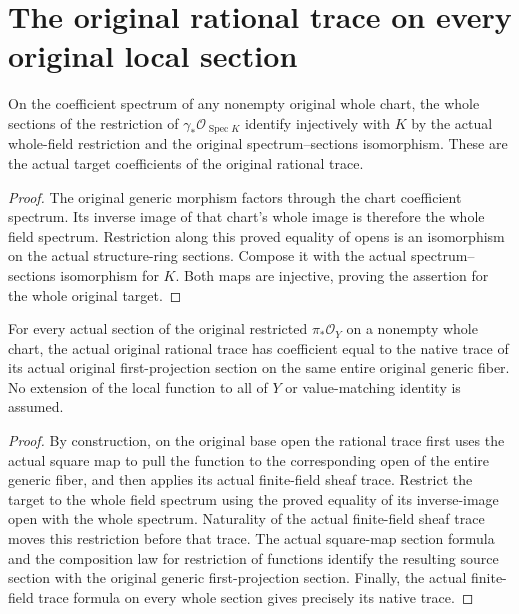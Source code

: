 \section{The original rational trace on every original local section}

\begin{lemma}
\label{lem:kn-structure-trace-generic-target-coefficients}
\leanok
On the coefficient spectrum of any nonempty original whole chart, the
whole sections of the restriction of $\gamma_*\mathcal O_{\operatorname{Spec}K}$
identify injectively with $K$ by the actual whole-field restriction and
the original spectrum--sections isomorphism. These are the actual
target coefficients of the original rational trace.
\end{lemma}
\begin{proof}
The original generic morphism factors through the chart coefficient
spectrum. Its inverse image of that chart's whole image is therefore
the whole field spectrum. Restriction along this proved equality of
opens is an isomorphism on the actual structure-ring sections. Compose
it with the actual spectrum--sections isomorphism for $K$. Both maps
are injective, proving the assertion for the whole original target.
\end{proof}

\begin{lemma}
\label{lem:kn-structure-trace-rational-original-local-value}
\leanok
For every actual section of the original restricted $\pi_*\mathcal O_Y$
on a nonempty whole chart, the actual original rational trace has
coefficient equal to the native trace of its actual original
first-projection section on the same entire original generic fiber.
No extension of the local function to all of $Y$ or value-matching
identity is assumed.
\end{lemma}
\begin{proof}
By construction, on the original base open the rational trace first
uses the actual square map to pull the function to the corresponding
open of the entire generic fiber, and then applies its actual
finite-field sheaf trace. Restrict the target to the whole field
spectrum using the proved equality of its inverse-image open with the
whole spectrum. Naturality of the actual finite-field sheaf trace
moves this restriction before that trace. The actual square-map
section formula and the composition law for restriction of functions
identify the resulting source section with the original generic
first-projection section. Finally, the actual finite-field trace
formula on every whole section gives precisely its native trace.
\end{proof}
